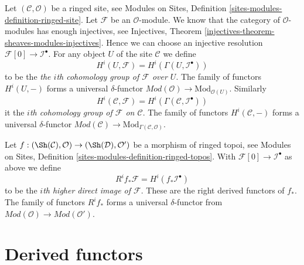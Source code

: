 \medskip\noindent
Let $(\mathcal{C}, \mathcal{O})$ be a ringed site, see
Modules on Sites, Definition \ref{sites-modules-definition-ringed-site}.
Let $\mathcal{F}$ be an $\mathcal{O}$-module.
We know that the category of $\mathcal{O}$-modules
has enough injectives, see
Injectives, Theorem \ref{injectives-theorem-sheaves-modules-injectives}.
Hence we can choose an injective resolution
$\mathcal{F}[0] \to \mathcal{I}^\bullet$.
For any object $U$ of the site $\mathcal{C}$ we define
\begin{equation}
\label{equation-cohomology-object-site-modules}
H^i(U, \mathcal{F}) = H^i(\Gamma(U, \mathcal{I}^\bullet))
\end{equation}
to be the {\it the $i$th cohomology group of $\mathcal{F}$ over $U$}.
The family of functors $H^i(U, -)$ forms a universal $\delta$-functor
$\textit{Mod}(\mathcal{O}) \to \text{Mod}_{\mathcal{O}(U)}$. Similarly
\begin{equation}
\label{equation-cohomology-modules}
H^i(\mathcal{C}, \mathcal{F}) = H^i(\Gamma(\mathcal{C}, \mathcal{I}^\bullet))
\end{equation}
it the {\it $i$th cohomology group of $\mathcal{F}$ on $\mathcal{C}$}.
The family of functors $H^i(\mathcal{C}, -)$ forms a universal
$\delta$-functor
$\textit{Mod}(\mathcal{C}) \to \text{Mod}_{\Gamma(\mathcal{C}, \mathcal{O})}$.

\medskip\noindent
Let $f : (\Sh(\mathcal{C}), \mathcal{O}) \to (\Sh(\mathcal{D}), \mathcal{O}')$
be a morphism of ringed topoi, see
Modules on Sites, Definition \ref{sites-modules-definition-ringed-topos}.
With $\mathcal{F}[0] \to \mathcal{I}^\bullet$ as above
we define
\begin{equation}
\label{equation-higher-direct-image-modules}
R^if_*\mathcal{F} = H^i(f_*\mathcal{I}^\bullet)
\end{equation}
to be the {\it $i$th higher direct image of $\mathcal{F}$}.
These are the right derived functors of $f_*$.
The family of functors $R^if_*$ forms a universal $\delta$-functor
from $\textit{Mod}(\mathcal{O}) \to \textit{Mod}(\mathcal{O}')$.








\section{Derived functors}
\label{section-derived-functors}

